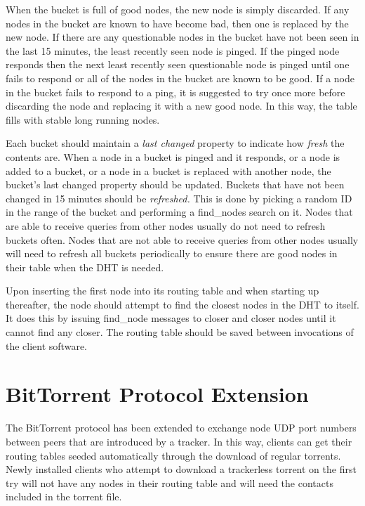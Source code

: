 \documentclass{article}
\begin{document}
When the bucket is full of good nodes, the new node is simply discarded. If any nodes in the bucket are known to have become bad, then one is replaced by the new node. If there are any questionable nodes in the bucket have not been seen in the last 15 minutes, the least recently seen node is pinged. If the pinged node responds then the next least recently seen questionable node is pinged until one fails to respond or all of the nodes in the bucket are known to be good. If a node in the bucket fails to respond to a ping, it is suggested to try once more before discarding the node and replacing it with a new good node. In this way, the table fills with stable long running nodes.

Each bucket should maintain a {\em last changed} property to indicate how {\em fresh} the contents are. When a node in a bucket is pinged and it responds, or a node is added to a bucket, or a node in a bucket is replaced with another node, the bucket's last changed property should be updated. Buckets that have not been changed in 15 minutes should be {\em refreshed.} This is done by picking a random ID in the range of the bucket and performing a find\_nodes search on it. Nodes that are able to receive queries from other nodes usually do not need to refresh buckets often. Nodes that are not able to receive queries from other nodes usually will need to refresh all buckets periodically to ensure there are good nodes in their table when the DHT is needed.

Upon inserting the first node into its routing table and when starting up thereafter, the node should attempt to find the closest nodes in the DHT to itself. It does this by issuing find\_node messages to closer and closer nodes until it cannot find any closer. The routing table should be saved between invocations of the client software.

{\section {BitTorrent Protocol Extension}}

The BitTorrent protocol has been extended to exchange node UDP port numbers between peers that are introduced by a tracker. In this way, clients can get their routing tables seeded automatically through the download of regular torrents. Newly installed clients who attempt to download a trackerless torrent on the first try will not have any nodes in their routing table and will need the contacts included in the torrent file.
\end{document}

